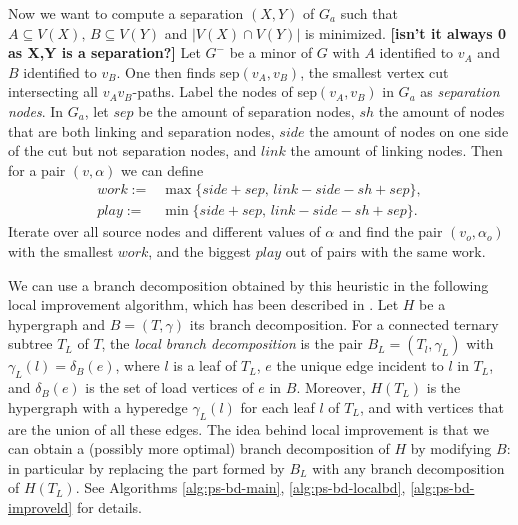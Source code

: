 Now we want to compute a separation $(X,Y)$ of $G_a$ such that $A \subseteq V(X),\, B \subseteq V(Y)$ and $|V(X) \cap V(Y)|$ is minimized.
\textbf{[isn't it always 0 as X,Y is a separation?]}
Let $G^-$ be a minor of $G$ with $A$ identified to $v_A$ and $B$ identified to $v_B$.
One then finds sep$(v_A, v_B)$, the smallest vertex cut intersecting all $v_Av_B$-paths.
Label the nodes of sep$(v_A, v_B)$ in $G_a$ as {\em separation nodes}.
In $G_a$, let $sep$ be the amount of separation nodes, $sh$ the amount of nodes that are both linking and separation nodes, $side$ the amount of nodes on one side of the cut but not separation nodes, and $link$ the amount of linking nodes.
Then for a pair $(v, \alpha)$ we can define
\begin{align*}
	work := & \max\{ side + sep,\, link - side - sh + sep \}, \\
	play := & \min\{ side + sep,\, link - side - sh + sep \}.
\end{align*}
Iterate over all source nodes and different values of $\alpha$ and find the pair $(v_o, \alpha_o)$ with the smallest $work$, and the biggest $play$ out of pairs with the same work.

We can use a branch decomposition obtained by this heuristic in the following local improvement algorithm, which has been described in \cite{DBLP:journals/tocl/LodhaOS19}.
Let $H$ be a hypergraph and $B=(T,\gamma)$ its branch decomposition.
For a connected ternary subtree $T_L$ of $T$, the {\em local branch decomposition} is the pair $B_L=(T_l, \gamma_L)$ with $\gamma_L(l) = \delta_B(e)$, where $l$ is a leaf of $T_L$, $e$ the unique edge incident to $l$ in $T_L$, and $\delta_B(e)$ is the set of load vertices of $e$ in $B$.
Moreover, $H(T_L)$ is the hypergraph with a hyperedge $\gamma_L(l)$ for each leaf $l$ of $T_L$, and with vertices that are the union of all these edges.  
The idea behind local improvement is that we can obtain a (possibly more optimal) branch decomposition of $H$ by modifying $B$: in particular by replacing the part formed by $B_L$ with any branch decomposition of $H(T_L)$.
See Algorithms \ref{alg:ps-bd-main}, \ref{alg:ps-bd-localbd}, \ref{alg:ps-bd-improveld} for details.

